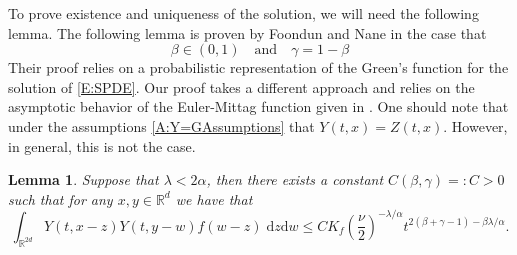\documentclass[a4paper,11pt]{article}
\numberwithin{equation}{section}
\theoremstyle{plain}
\newtheorem{lemma}[theorem]{Lemma}
\theoremstyle{definition}
\newcommand{\ud}{\ensuremath{\mathrm{d} }}
\newcommand{\R}{\mathbb{R}}
\numberwithin{NQ}{section}
\numberwithin{LQ}{section}
\numberwithin{ZQ}{section}
\begin{document}
	To prove existence and uniqueness of the solution, we will need the following lemma. The following lemma is proven by Foondun and Nane \cite{FN2016} in the case that 		
	\begin{equation}
	\label{A:Y=GAssumptions}
	\beta \in (0,1) \quad \text{and} \quad \gamma = 1 - \beta
	\end{equation}		
	Their proof relies on a probabilistic representation of the Green's function for the solution of \eqref{E:SPDE}. Our proof takes a different approach and relies on the asymptotic behavior of the Euler-Mittag function given in \cite[Theorem 1.6]{Podlubny99}. One should note that under the assumptions \eqref{A:Y=GAssumptions} that $Y(t,x)=Z(t,x)$. However, in general, this is not the case. 
	
	\begin{lemma}
		\label{L:intYfYbdd}
		Suppose that $\lambda < 2\alpha$, then there exists a constant $C(\beta,\gamma) =: C >0$ such that for any $x,y \in \R^d$ we have that 
		\begin{equation}
		\label{E:YYfBdd}
		\int_{\R^{2d}} Y(t,x-z)Y(t,y-w)f(w-z) \; \ud z \ud w \le C K_f \left( \frac{\nu}{2} \right)^{-\lambda / \alpha} t^{2(\beta + \gamma -1)-\beta \lambda / \alpha}.
		\end{equation}
	\end{lemma}
\end{document}

